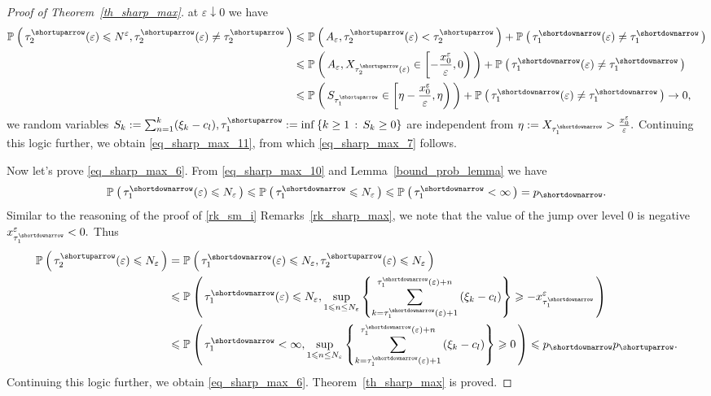 \documentclass{article}
\theoremstyle{plain}
\theoremstyle{definition}
\theoremstyle{remark}
\newcommand{\p}[2][]{{\mathbb{P}}_{#1} \left( \, #2 \, \right) } %
\newcommand{\ra }{ \rightarrow} %
\newcommand{\skk}[1]{\left\{ #1 \right\}} %
\begin{document}
\begin{proof}[Proof of Theorem~\ref{th_sharp_max}]
at $\varepsilon \downarrow 0$ we have
\begin{equation*}
\begin{split}
\p{ \tau_{2}^{\shortuparrow}(\varepsilon) \leqslant N^{\varepsilon}, \tau_{2}^{\shortuparrow}(\varepsilon) \neq \tau_{2}^{\shortuparrow} }  & \leqslant \p{ A_{\varepsilon}, \tau_{2}^{\shortuparrow}(\varepsilon) < \tau_{2}^{\shortuparrow} }  +  \p{ \tau_{1}^{\shortdownarrow}(\varepsilon) \neq \tau_{1}^{\shortdownarrow} } \\
& \leqslant  \p{ A_{\varepsilon}, X_{\tau_{2}^{\shortuparrow}(\varepsilon)} \in  \left[-\frac{x_0^{\varepsilon}}{\varepsilon}, 0\right)}  +  \p{ \tau_{1}^{\shortdownarrow}(\varepsilon) \neq \tau_{1}^{\shortdownarrow} }  \\ 
& \leqslant \p{S_{\tau_{1}^{\shortuparrow}} \in  \left[\eta - \frac{x_0^{\varepsilon}}{\varepsilon}, \eta \right)} + \p{ \tau_{1}^{\shortdownarrow}(\varepsilon) \neq \tau_{1}^{\shortdownarrow} } 
\ra 0,
\end{split}
\end{equation*}
we random variables $S_k := \sum_{n=1}^k (\xi_k - c_l), \tau_{1}^{\shortuparrow}: = \inf\skk{ k \geq 1 \,:\, S_k \geq 0}$ are independent from $ \eta := X_{\tau_1^{\shortdownarrow}} > \frac{x_0^{\varepsilon}}{\varepsilon}.$
Continuing this logic further, we obtain \eqref{eq_sharp_max_11}, 
 from which \eqref{eq_sharp_max_7} follows.

Now let's prove \eqref{eq_sharp_max_6}. From \eqref{eq_sharp_max_10}  and Lemma~\ref{bound_prob_lemma} we have
$$
\p{\tau_{1}^{\shortdownarrow}(\varepsilon) \leqslant N_{\varepsilon}} \leqslant  \p{ \tau_{1}^{\shortdownarrow} \leqslant N_{\varepsilon} } \leqslant \p{ \tau_{1}^{\shortdownarrow} < \infty } = p_{{\shortdownarrow}}.
$$
Similar to the reasoning of the proof of \ref{rk_sm_i} Remarks~\ref{rk_sharp_max}, we note that the value of the jump over level $0$ is negative$ x^{\varepsilon}_{\tau_{1}^{\shortdownarrow}}  < 0.$ Thus 
\begin{equation*}
\begin{split}
\p{\tau_{2}^{\shortuparrow}(\varepsilon) \leqslant N_{\varepsilon}}  & =    \p{\tau_{1}^{\shortdownarrow}(\varepsilon) \leqslant N_{\varepsilon}, \tau_{2}^{\shortuparrow}(\varepsilon) \leqslant N_{\varepsilon} } \\
& \leqslant \p{\tau_{1}^{\shortdownarrow}(\varepsilon) \leqslant N_{\varepsilon} ,  \sup\limits_{1 \leqslant n\leq N_{\varepsilon} } \skk{\sum\limits_{k=\tau_1^{\shortdownarrow}(\varepsilon)+1}^{\tau_1^{\shortdownarrow}(\varepsilon)+n} \left(\xi_k -c_l\right )} \geqslant - x^{\varepsilon}_{\tau_{1}^{\shortdownarrow}}} \\ 
& \leqslant \p{\tau_{1}^{\shortdownarrow} < \infty, \sup\limits_{1 \leqslant n\leq N_{\varepsilon} } \skk{\sum\limits_{k=\tau_1^{\shortdownarrow}(\varepsilon)+1}^{\tau_1^{\shortdownarrow}(\varepsilon)+n} \left(\xi_k -c_l\right )} \geqslant 0} \leqslant p_{{\shortdownarrow}} p_{{\shortuparrow}}.
\end{split}
\end{equation*}
Continuing this logic further, we obtain \eqref{eq_sharp_max_6}.  Theorem~\ref{th_sharp_max} is proved.


\end{proof}
\end{document}
